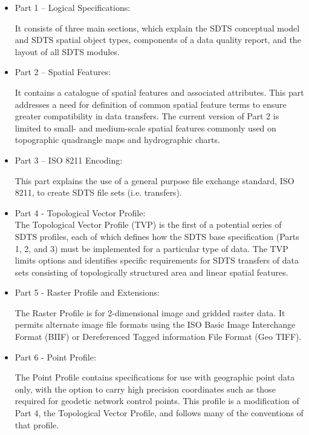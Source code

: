 \documentclass[11pt]{article}
\begin{document}
\begin{itemize}
\item Part 1 – Logical Specifications:
\par\noindent It consists of three main sections, which explain the SDTS conceptual model and SDTS spatial object types, components of a data quality report, and the layout of all SDTS modules.
\item Part 2 – Spatial Features: 
\par\noindent It contains a catalogue of spatial features and associated attributes. This part addresses a need for definition of common spatial feature terms to ensure greater compatibility in data transfers. The current version of Part 2 is limited to small- and medium-scale spatial features commonly used on topographic quadrangle maps and hydrographic charts.
\item Part 3 – ISO 8211 Encoding: 
\par\noindent This part explains the use of a general purpose file exchange standard, ISO 8211, to create SDTS file sets (i.e. transfers).
\item Part 4 - Topological Vector Profile:\\
The Topological Vector Profile (TVP) is the first of a potential series of SDTS profiles, each of which defines how the SDTS base specification (Parts 1, 2, and 3) must be implemented for a particular type of data. The TVP limits options and identifies specific requirements for SDTS transfers of data sets consisting of topologically structured area and linear spatial features.
\item Part 5 - Raster Profile and Extensions: 
\par\noindent The Raster Profile is for 2-dimensional image and gridded raster data. It permits alternate image file formats using the ISO Basic Image Interchange Format (BIIF) or Dereferenced Tagged information File Format (Geo TIFF).
\item Part 6 - Point Profile: 
\par\noindent The Point Profile contains specifications for use with geographic point data only, with the option to carry high precision coordinates such as those required for geodetic network control points. This profile is a modification of Part 4, the Topological Vector Profile, and follows many of the conventions of that profile.
\end{itemize}
\end{document}
